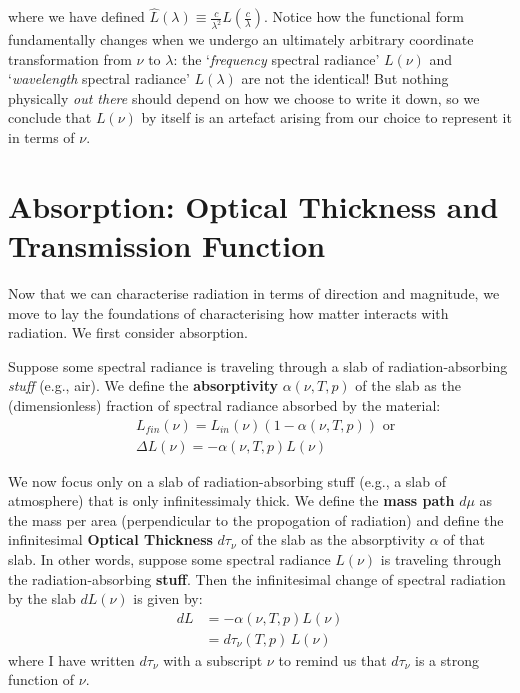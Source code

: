 \noindent where we have defined $\hat{L}(\lambda)\equiv\frac{c}{\lambda^2}L\left(\frac{c}{\lambda}\right)$. Notice how the functional form fundamentally changes when we undergo an ultimately arbitrary coordinate transformation from $\nu$ to $\lambda$: the `\textit{frequency} spectral radiance' $L(\nu)$ and `\textit{wavelength} spectral radiance' $L(\lambda)$ are not the identical! But nothing physically \textit{out there} should depend on how we choose to write it down, so we conclude that $L(\nu)$ by itself is an artefact arising from our choice to represent it in terms of $\nu$.

\section{Absorption: Optical Thickness and Transmission Function}

Now that we can characterise radiation in terms of direction and magnitude, we move to lay the foundations of characterising how matter interacts with radiation. We first consider absorption.

Suppose some spectral radiance is traveling through a slab of radiation-absorbing \textit{stuff} (e.g., air). We define the \textbf{absorptivity} $\alpha(\nu,T,p)$ of the slab as the (dimensionless) fraction of spectral radiance absorbed by the material:
\begin{align*}
    &L_{fin}(\nu)=L_{in}(\nu)(1-\alpha(\nu,T,p))\text{    or}\\
    &\Delta L(\nu) = -\alpha(\nu,T,p)L(\nu)
\end{align*}

We now focus only on a slab of radiation-absorbing stuff (e.g., a slab of atmosphere) that is only infinitessimaly thick. We define the \textbf{mass path} $d\mu$ as the mass per area (perpendicular to the propogation of radiation) and define the infinitesimal \textbf{Optical Thickness} $d\tau_\nu$ of the slab as the absorptivity $\alpha$ of that slab. In other words, suppose some spectral radiance $L(\nu)$ is traveling through the radiation-absorbing \textbf{stuff}. Then the infinitesimal change of spectral radiation by the slab $dL(\nu)$ is given by:
\begin{align*}
    dL &= -\alpha(\nu,T,p)L(\nu)\\
    &= d\tau_\nu(T,p)\,L(\nu)
\end{align*}
where I have written $d\tau_\nu$ with a subscript $\nu$ to remind us that $d\tau_\nu$ is a strong function of $\nu$. 

